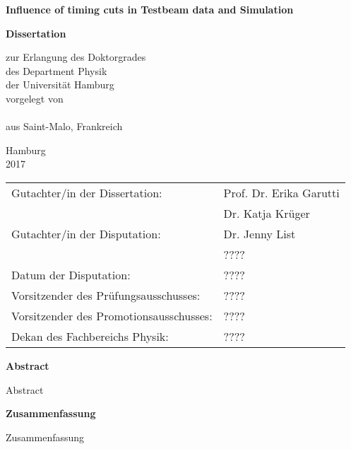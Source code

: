 \begin{titlepage}

\thispagestyle{empty}
\begin{center}
\null
\vfill
{\huge \bf Influence of timing cuts in Testbeam data and Simulation\\}

\vspace{4cm}

{\LARGE \bf Dissertation\\}

\vspace{0.5cm}
{\Large
  zur Erlangung des Doktorgrades\\
  des Department Physik\\
  der Universit\"{a}t Hamburg\\
  \vspace{2.5cm}
  vorgelegt von\\
  \vspace{0.5cm}
  \makeatletter
  \textsc{\@author}\\
  \makeatother
  \vspace{0.5cm}
  aus Saint-Malo, Frankreich\\

  \vspace{5cm}

  Hamburg\\
  2017\\
 }

 \newpage
 \thispagestyle{empty}
 \null
 \vfill
 \begin{tabular}{ll}
   Gutachter/in der Dissertation: & Prof. Dr. Erika Garutti\\
                                  & Dr. Katja Kr\"uger\\[3mm]
   Gutachter/in der Disputation: & Dr. Jenny List\\
                                 & ????\\[3mm]
   Datum der Disputation: & ????\\[3mm]
   Vorsitzender des Pr\"{u}fungsausschusses: & ????\\[3mm]
   Vorsitzender des Promotionsausschusses: & ????\\[3mm]
   Dekan des Fachbereichs Physik:& ????\\[3mm]
 \end{tabular}

\end{center}

\newpage
\thispagestyle{empty}
\begin{center}
{\bf Abstract}
\end{center}
Abstract

\newpage
\thispagestyle{empty}
\begin{center}
{\bf Zusammenfassung}
\end{center}
Zusammenfassung

\end{titlepage}

\newpage

\tableofcontents
